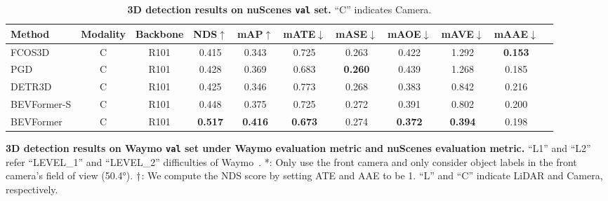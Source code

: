 \documentclass{article}
\begin{document}
\begin{table}[t]
\begin{center}
\caption{
\textbf{3D detection results on nuScenes \texttt{val} set.} ``C'' indicates Camera.
}

\setlength{\tabcolsep}{0.87mm}
\begin{tabular}{l  c c |c c| c c c c c c  }
\toprule
Method &  Modality & Backbone & NDS$\uparrow$  & mAP$\uparrow$  & mATE$\downarrow$     & mASE$\downarrow$     & mAOE$\downarrow$     & mAVE$\downarrow$    & mAAE$\downarrow$    \\
\midrule


FCOS3D~\cite{wang2021fcos3d}&  C & R101& 0.415 & 0.343 & 0.725 & 0.263 & 0.422 & 1.292  &\textbf{0.153}  \\
PGD~\cite{wang2022probabilistic} & C &R101 & 0.428 &0.369 &0.683 &\textbf{0.260}& 0.439 &1.268 &0.185 \\
DETR3D~\cite{wang2022detr3d}& C& R101 & 0.425 &0.346 &0.773 &0.268 &0.383 &0.842 &0.216\\




\rowcolor{gray95}
BEVFormer-S & C & R101& 0.448 & 0.375 & 0.725 & 0.272 & 0.391 & 0.802 & 0.200\\
\rowcolor{gray9}
BEVFormer   & C & R101& \textbf{0.517}& \textbf{0.416} & \textbf{0.673} & 0.274 & \textbf{0.372} & \textbf{0.394} & 0.198 \\
\bottomrule
\end{tabular} \label{val_det}
\end{center}
\end{table}

\begin{table}[t] 
\begin{center}
\caption{\textbf{3D detection results  on Waymo \texttt{val} set under  Waymo evaluation metric and nuScenes evaluation metric.} ``L1'' and ``L2'' refer ``LEVEL\_1'' and ``LEVEL\_2'' difficulties of Waymo~\cite{sun2020scalability}. *:  Only use the
front camera and only consider object labels in the front camera’s field of view (50.4°).
${\text{\textdagger}}$: We compute the NDS score by setting ATE and AAE to be 1. ``L'' and ``C'' indicate LiDAR and Camera, respectively.
}

\setlength{\tabcolsep}{0.5mm}

\label{table:Waymo}
\end{center}
\end{table}
\end{document}
